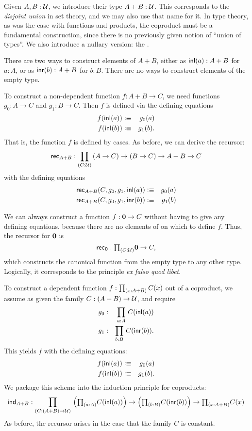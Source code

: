 Given $A,B:\mathcal{U}$, we introduce their  type $A+B:\mathcal{U}$.
This corresponds to the \emph{disjoint union} in set theory, and we may also use that name for it.
In type theory, as was the case with functions and products, the coproduct must be a fundamental construction, since there is no previously given notion of ``union of types''.
We also introduce a
nullary version: the .

There are two ways to construct elements of $A+B$, either as ${\mathsf{inl}}(a) : A+B$ for $a:A$, or as
${\mathsf{inr}}(b):A+B$ for $b:B$. There are no ways to construct elements of the empty type. 

To construct a non-dependent function $f : A+B \to C$, we need 
functions $g_0 : A \to C$ and $g_1 : B \to C$. Then $f$ is defined
via the defining equations
\begin{eqnarray*}
  f({\mathsf{inl}}(a)) & \vcentcolon\equiv & g_0(a) \\
  f({\mathsf{inl}}(b)) & \vcentcolon\equiv & g_1(b).
\end{eqnarray*}
That is, the function $f$ is defined by cases. As before, we can
derive the recursor:
\[ \rec{A+B} : \dprd{C:\UU}(A \to C) \to (B\to C) \to A+B \to C\]
with the defining equations
\begin{eqnarray*}
\mathsf{rec}_{A+B}(C,g_0,g_1,{\mathsf{inl}}(a)) & \vcentcolon\equiv & g_0(a) \\
\mathsf{rec}_{A+B}(C,g_0,g_1,{\mathsf{inr}}(b)) & \vcentcolon\equiv & g_1(b)
\end{eqnarray*}

We can always construct a function $f : \mathbf{0} \to C$ without
having to give any defining equations, because there are no elements of \emptyt on which to define $f$.
Thus, the recursor for $\mathbf{0}$ is
\[\rec{\emptyt} : \tprd{C:\UU} \emptyt \to C,\]
which constructs the canonical function from the empty type to any other type.
Logically, it corresponds to the principle \emph{ex falso quod libet}. 

To construct a dependent function $f:\prd{x:A+B}C(x)$ out of a coproduct, we assume as given the family 
$C: (A + B) \to \mathcal{U}$, and 
require 
\begin{eqnarray*}
  g_0 & : & \prd{a:A} C(\inl(a)) \\
  g_1 & : & \prd{b:B} C(\inr(b)).
\end{eqnarray*}
This yields $f$ with the defining equations:
\begin{eqnarray*}
  f({\mathsf{inl}}(a)) & \vcentcolon\equiv & g_0(a) \\
  f({\mathsf{inl}}(b)) & \vcentcolon\equiv & g_1(b) .
\end{eqnarray*}
We package this scheme into the induction principle for coproducts:
\begin{align*}
  \ind{A+B} :  \dprd{C: (A + B) \to \UU}
  \Big(\tprd{a:A} C(\inl(a))\Big) \to \Big(\tprd{b:B} C(\inr(b))\Big)
  \to \tprd{x:A+B}C(x) 
\end{align*}
As before, the recursor arises in the case that the family $C$ is
constant. 

